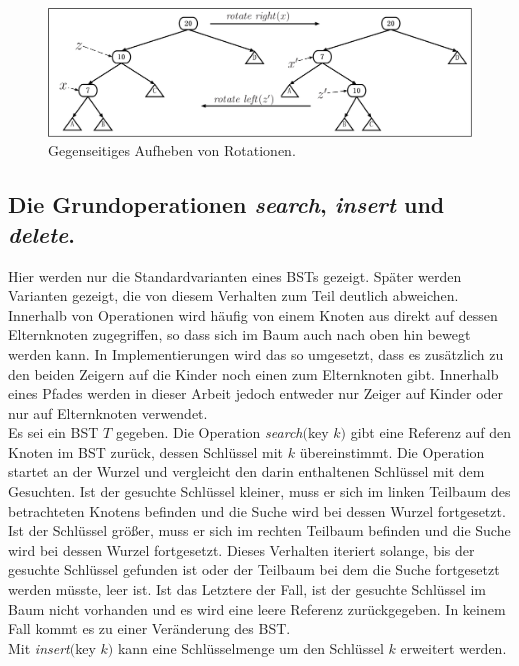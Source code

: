 \documentclass[a4paper,12pt]{article}
\begin{document}
\begin{figure}[H]
	\centering
	\includegraphics[width= 1\textwidth]{Medien/Einleitung/LinksRechtsRotation}
	\caption{Gegenseitiges Aufheben von Rotationen.}
	\label{fig:LinksRechtsRotation}
\end{figure}

\subsection{Die Grundoperationen \textit{search}, \textit{insert} und \textit{delete}.} \label{BST Operationen}
Hier werden nur die Standardvarianten eines BSTs gezeigt. Später werden Varianten gezeigt, die von diesem Verhalten zum Teil deutlich abweichen. Innerhalb von Operationen wird häufig von einem Knoten aus direkt
auf dessen Elternknoten zugegriffen, so dass sich im Baum auch nach oben hin bewegt werden kann. In Implementierungen wird das so umgesetzt, dass es zusätzlich zu den beiden Zeigern auf die Kinder noch einen zum Elternknoten gibt. Innerhalb eines Pfades werden in dieser Arbeit jedoch entweder nur Zeiger auf Kinder oder nur auf Elternknoten verwendet.\\
 Es sei ein BST $T$ gegeben. Die Operation \textit{search}$($key $k)$ gibt eine Referenz auf den Knoten im BST zurück, dessen Schlüssel mit $k$ übereinstimmt. Die Operation startet an der Wurzel und vergleicht den darin enthaltenen Schlüssel mit dem Gesuchten. Ist der gesuchte Schlüssel kleiner, muss er sich im linken Teilbaum des betrachteten Knotens befinden und die Suche wird bei dessen Wurzel fortgesetzt. Ist der Schlüssel größer, muss er sich im rechten Teilbaum befinden und die Suche wird bei dessen Wurzel fortgesetzt. Dieses Verhalten iteriert solange, bis der gesuchte Schlüssel gefunden ist oder der Teilbaum bei dem die Suche fortgesetzt werden müsste, leer ist. Ist das Letztere der Fall, ist der gesuchte Schlüssel im Baum nicht vorhanden und es wird eine leere Referenz zurückgegeben. In keinem Fall kommt es zu einer Veränderung des BST.\\
Mit \textit{insert}$($key $k)$  kann eine Schlüsselmenge um den Schlüssel $k$ erweitert werden. 
\end{document}
